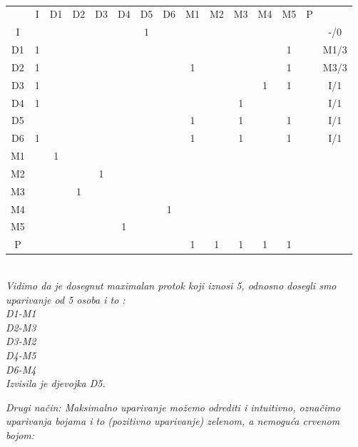 \documentclass[12pt]{article}
\begin{document}
\begin{enumerate}
\begin{center}
\vspace{0.3CM}
\\
\begin{tabular}{|c|c|c|c|c|c|c|c|c|c|c|c|c|c|c}
\cline{1-14}
 & I & D1 & D2 & D3 & D4 & D5 & D6 & M1 & M2 & M3 & M4 & M5 & P &  \\ \cline{1-14}
I &  &  &  &  &  & 1 &  &  &  &  &  &  &  & -/0 \\ \cline{1-14}
D1 & 1 &  &  &  &  &  &  &  &  &  &  & 1 &  & M1/3 \\ \cline{1-14}
D2 & 1 &  &  &  &  &  &  & 1 &  & \textbf{} &  & 1 &  & M3/3 \\ \cline{1-14}
D3 & 1 &  &  &  &  &  &  &  & \textbf{} &  & 1 & 1 &  & I/1 \\ \cline{1-14}
D4 & 1 &  &  &  &  &  &  &  &  & 1 &  & \textbf{} &  & I/1 \\ \cline{1-14}
D5 &  &  &  &  &  &  &  & 1 &  & 1 &  & 1 &  & I/1 \\ \cline{1-14}
D6 & 1 &  &  &  &  &  &  & 1 &  & 1 & \textbf{} & 1 &  & I/1 \\ \cline{1-14}
M1 &  & 1 &  &  &  &  &  &  &  &  &  &  &  &  \\ \cline{1-14}
M2 &  &  &  & 1 &  &  &  &  &  &  &  &  & \textbf{} &  \\ \cline{1-14}
M3 &  &  & 1 &  &  &  &  &  &  &  &  &  & \textbf{} &  \\ \cline{1-14}
M4 &  &  &  &  &  &  & 1 &  &  &  &  &  & \textbf{} &  \\ \cline{1-14}
M5 &  &  &  &  & 1 &  &  &  &  &  &  &  & \textbf{} &  \\ \cline{1-14}
P &  &  &  &  &  &  &  & 1 & 1 & 1 & 1 & 1 &  & \\ \cline{1-14}
\end{tabular}
\\
\newpage
\textit{
Vidimo da je dosegnut maximalan protok koji iznosi 5, odnosno dosegli smo uparivanje od 5 osoba i to :\\
D1-M1\\
D2-M3\\
D3-M2\\
D4-M5\\
D6-M4\\
Izvisila je djevojka D5.
}





         \textit{Drugi način: Maksimalno uparivanje možemo odrediti i intuitivno, označimo uparivanja bojama i to (pozitivno uparivanje) zelenom, a nemoguća crvenom bojom:\\}
         \vspace{0.5cm}
         

\end{center}
\end{enumerate}
\end{document}
